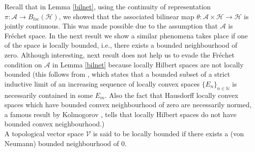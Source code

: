 \documentclass[10pt]{article}
\theoremstyle{definition}
\begin{document}
	
	Recall that in Lemma \ref{bilnet}, using the continuity of representation $\pi:\mathcal A\to B_{loc}(\mathcal H)$, we showed that the associated bilinear map $\theta:\mathcal A\times \mathcal H\to \mathcal H$ is jointly continuous. This was made possible due to the assumption that $\mathcal A$ is Fr\'echet space. In the next result we show a similar phenomena takes place if one of the space is locally bounded, i.e., there exists a bounded neighbourhood of zero. Although  interesting, next result does not help us to evade the Fr\'echet condition on $\mathcal A$ in Lemma \ref{bilnet} because locally Hilbert spaces are not locally bounded (this follows from \cite[4.6, Thm. 2]{Jarchow}, which states that a bounded subset of a strict inductive limit of an increasing sequence of locally convex spaces $\{E_n\}_{n\in \mathbb N}$ is necessarily contained in some $E_m$. Also the fact that Hausdorff locally convex spaces which have bounded convex neighbourhood of zero are necessarily normed, a famous result by Kolmogorov \cite{Kolmogorov}, tells that locally Hilbert spaces do not have bounded convex neighbourhood.)\\
	
	A topological vector space $\mathcal V$ is said to be locally bounded if there exists a (von Neumann) bounded neighbourhood of $0$.
	
\end{document}
